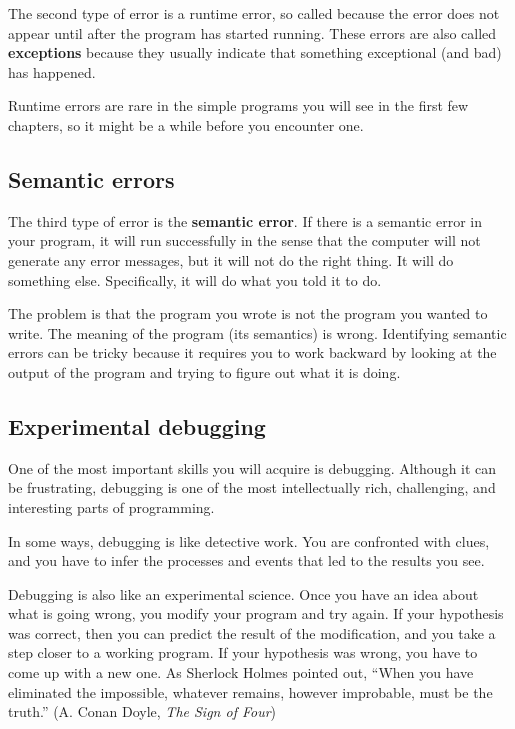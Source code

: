 \documentclass[10pt]{book}
\begin{document}
The second type of error is a runtime error, so called because the
error does not appear until after the program has started running.
These errors are also called {\bf exceptions} because they usually
indicate that something exceptional (and bad) has happened.

Runtime errors are rare in the simple programs you will see in the
first few chapters, so it might be a while before you encounter one.


\subsection{Semantic errors}

The third type of error is the {\bf semantic error}.  If there is a
semantic error in your program, it will run successfully in the sense
that the computer will not generate any error messages, but it will
not do the right thing.  It will do something else.  Specifically, it
will do what you told it to do.

The problem is that the program you wrote is not the program you
wanted to write.  The meaning of the program (its semantics) is wrong.
Identifying semantic errors can be tricky because it requires you to work
backward by looking at the output of the program and trying to figure
out what it is doing.

\subsection{Experimental debugging}

One of the most important skills you will acquire is debugging.
Although it can be frustrating, debugging is one of the most
intellectually rich, challenging, and interesting parts of
programming.


In some ways, debugging is like detective work.  You are confronted
with clues, and you have to infer the processes and events that led
to the results you see.

Debugging is also like an experimental science.  Once you have an idea
about what is going wrong, you modify your program and try again.  If
your hypothesis was correct, then you can predict the result of the
modification, and you take a step closer to a working program.  If
your hypothesis was wrong, you have to come up with a new one.  As
Sherlock Holmes pointed out, ``When you have eliminated the
impossible, whatever remains, however improbable, must be the truth.''
(A. Conan Doyle, {\em The Sign of Four})
\end{document}
